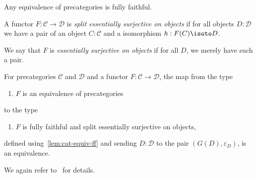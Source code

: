 \begin{lemma}\label{lem:cat-equiv-ff}
  Any equivalence of precategories is fully faithful.
\end{lemma}

\begin{definition}\label{def:functor-split-eso}
  A functor $F : \mathcal C \to \mathcal D$ is
  \emph{split essentially surjective on objects}
  if for all objects $D : \mathcal D$ we have a pair of an object $C:\mathcal C$
  and a isomorphism $h : F(C) \isoto D$.

  We say that $F$ is \emph{essentially surjective on objects} if for all $D$,
  we merely have such a pair.
\end{definition}

\begin{lemma}\label{lem:equiv-precat-is-ff-split-eso}
  For precategories $\mathcal C$ and $\mathcal D$
  and a functor $F : \mathcal C \to \mathcal D$,
  the map from the type
  \begin{enumerate}
  \item $F$ is an equivalence of precategories
  \end{enumerate}
  to the type
  \begin{enumerate}[resume]
  \item $F$ is fully faithful and split essentially surjective on objects,
  \end{enumerate}
  defined using~\cref{lem:cat-equiv-ff} and sending $D:\mathcal D$
  to the pair $(G(D), \varepsilon_D)$,
  is an equivalence.
\end{lemma}
We again refer to~\textcite[Lemma~6.6]{AKS2015} for details.

